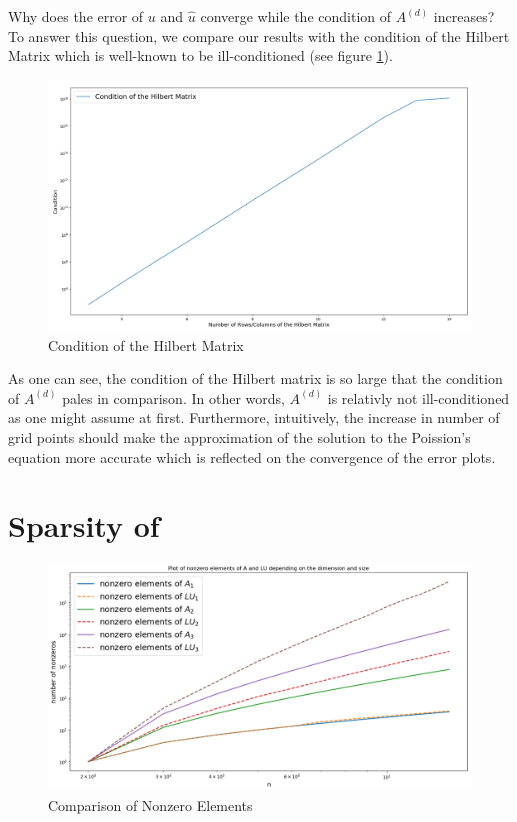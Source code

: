 \documentclass[refman]{article}
\theoremstyle{definition}
\begin{document}
Why does the error of \(u\) and \(\hat{u}\) converge while the condition of \(A^{(d)}\) increases? To answer this question, we compare our results with the condition of the Hilbert Matrix which is well-known to be ill-conditioned (see figure \ref{fig:hilbert_condition}).

\begin{figure}[h]
	\includegraphics[width=\linewidth]{graphics/hilbert_condition.png}
	\caption{Condition of the Hilbert Matrix}
	\label{fig:hilbert_condition}
\end{figure}
\bigskip

As one can see, the condition of the Hilbert matrix is so large that the condition of \(A^{(d)}\) pales in comparison. In other words, \(A^{(d)}\) is relativly not ill-conditioned as one might assume at first. Furthermore, intuitively, the increase in number of grid points should make the approximation of the solution to the Poission's equation more accurate which is reflected on the convergence of the error plots.

\section{Sparsity of}

\begin{figure}[h]
	\includegraphics[width=\linewidth]{graphics/non_zero.png}
	\caption{Comparison of Nonzero Elements}
	\label{fig:boat1}
\end{figure}
\end{document}
